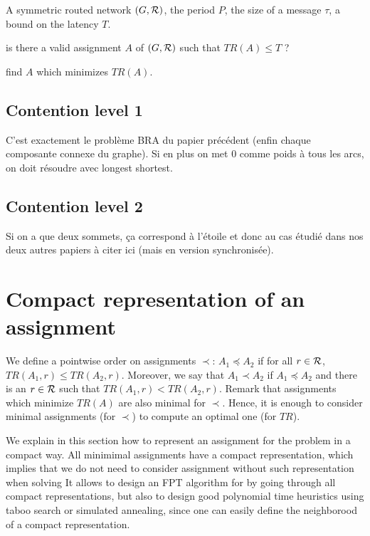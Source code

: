 \documentclass[english]{article}
\begin{document}
       

        A symmetric routed network $(G,{\cal R})$, the period $P$, the size of a message $\tau$, a bound on the latency $T$.
      
       is there a valid assignment $A$ of $(G,{\cal R})$ such that $ TR(A) \leq T$ ?

       find $A$ which minimizes $TR(A)$.
    
    

\subsection{Contention level 1}

C'est exactement le problème BRA du papier précédent (enfin chaque composante connexe du graphe).
Si en plus on met $0$ comme poids à tous les arcs, on doit résoudre avec longest shortest.

\subsection{Contention level 2}

Si on a que deux sommets, ça correspond à l'étoile et donc au cas étudié dans nos deux autres papiers à citer ici
(mais en version synchronisée). 

    

\section{Compact representation of an assignment}

 We define a pointwise order on assignments $\prec$: $A_1 \preceq A_2$ if for all $r\in \cal{R}$, $TR(A_1,r) \leq TR(A_2,r)$. Moreover, we say that $A_1 \prec A_2$ if $A_1 \preceq A_2$ and there is an $r \in \cal {R}$ such that  $TR(A_1,r) < TR(A_2,r)$. Remark that assignments which minimize $TR(A)$ are also minimal for $\prec$. Hence, it is enough to consider minimal assignments (for $\prec$) to compute an optimal one (for $TR$).

We explain in this section how to represent an assignment for the problem 
\spall in a compact way. All minimimal assignments have a compact representation, which implies that we do not need to consider assignment without such representation when solving \spall
It allows to design an FPT algorithm for \spall by going through all compact representations, but also to design good polynomial time heuristics using taboo search or simulated annealing, since one can easily define the neighborood of a compact representation.
\end{document}
